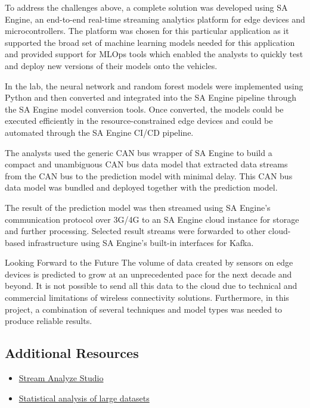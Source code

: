 {{{{{{To address the challenges above, a complete solution was developed using SA Engine, an end-to-end real-time streaming analytics platform for edge devices and microcontrollers. The platform was chosen for this particular application as it supported the broad set of machine learning models needed for this application and provided support for MLOps tools which enabled the analysts to quickly test and deploy new versions of their models onto the vehicles.

In the lab, the neural network and random forest models were implemented using Python and then converted and integrated into the SA Engine pipeline through the SA Engine model conversion tools. Once converted, the models could be executed efficiently in the resource-constrained edge devices and could be automated through the SA Engine CI/CD pipeline.

The analysts used the generic CAN bus wrapper of SA Engine to build a compact and unambiguous CAN bus data model that extracted data streams from the CAN bus to the prediction model with minimal delay. This CAN bus data model was bundled and deployed together with the prediction model.

The result of the prediction model was then streamed using SA Engine’s communication protocol over 3G/4G to an SA Engine cloud instance for storage and further processing. Selected result streams were forwarded to other cloud-based infrastructure using SA Engine’s built-in interfaces for Kafka.

Looking Forward to the Future
The volume of data created by sensors on edge devices is predicted to grow at an unprecedented pace for the next decade and beyond. It is not possible to send all this data to the cloud due to technical and commercial limitations of wireless connectivity solutions. Furthermore, in this project, a combination of several techniques and model types was needed to produce reliable results.

\subsection{Additional Resources}

\begin{itemize}
  \item \href{https://streamanalyze.com/studio-welcome/}{Stream Analyze Studio}
  \item \href{https://docs.streamanalyze.com/#/docs/usermd/statistical_analysis_guide/docs}{Statistical analysis of large datasets}
\end{itemize}

}}}}}}
